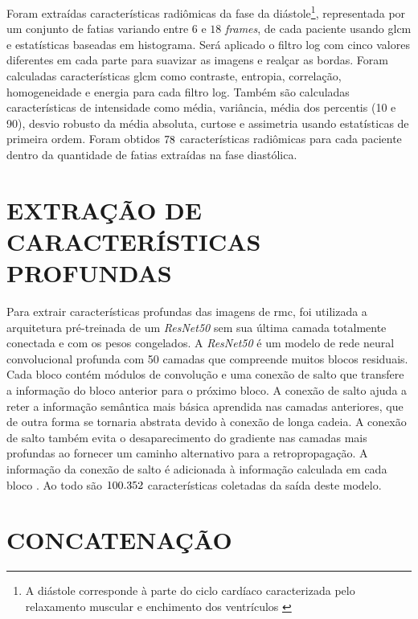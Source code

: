 Foram extraídas características radiômicas da fase da diástole\footnote{A diástole corresponde à parte do ciclo cardíaco caracterizada pelo relaxamento muscular e enchimento dos ventrículos \cite{brielerCardiomyopathyOverview2017}}, representada por um conjunto de fatias variando entre $6$ e $18$ \textit{frames}, de cada paciente usando \gls{glcm} e estatísticas baseadas em histograma. Será aplicado o filtro \gls{log} com cinco valores diferentes em cada parte para suavizar as imagens e realçar as bordas. Foram calculadas características \gls{glcm} como contraste, entropia, correlação, homogeneidade e energia para cada filtro \gls{log}. Também são calculadas características de intensidade como média, variância, média dos percentis (10 e 90), desvio robusto da média absoluta, curtose e assimetria usando estatísticas de primeira ordem. Foram obtidos $78$ características radiômicas para cada paciente dentro da quantidade de fatias extraídas na fase diastólica.

\section{EXTRAÇÃO DE CARACTERÍSTICAS PROFUNDAS}
\label{subsec:cap4_caracteristicas_profundas}
 
Para extrair características profundas das imagens de \gls{rmc}, foi utilizada a arquitetura pré-treinada de um \textit{ResNet50} sem sua última camada totalmente conectada e com os pesos congelados. A \textit{ResNet50} é um modelo de rede neural convolucional profunda com 50 camadas que compreende muitos blocos residuais. Cada bloco contém módulos de convolução e uma conexão de salto que transfere a informação do bloco anterior para o próximo bloco. A conexão de salto ajuda a reter a informação semântica mais básica aprendida nas camadas anteriores, que de outra forma se tornaria abstrata devido à conexão de longa cadeia. A conexão de salto também evita o desaparecimento do gradiente nas camadas mais profundas ao fornecer um caminho alternativo para a retropropagação. A informação da conexão de salto é adicionada à informação calculada em cada bloco \cite{aiSelfAttentionBasedFusion2023}. Ao todo são $100.352$ características coletadas da saída deste modelo.

\section{CONCATENAÇÃO}
\label{subsec:cap4_concatenacao}

